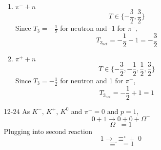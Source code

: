 \documentclass{2620hw}
\begin{document}
\begin{enumerate}
\begin{enumerate}
	\item $\pi^- +n$
	\[
		T \in \{-\frac{3}{2}, \frac{3}{2}\}
	\]
	Since $T_3 = -\frac{1}{2}$ for neutron and -1 for $\pi^-$,
	\[
		T_{3_{net}} = -\frac{1}{2}-1 = -\frac{3}{2}
	\]

	\item $\pi^+ +n$
	\[
		T \in \{-\frac{3}{2},-\frac{1}{2}, \frac{1}{2}, \frac{3}{2}\}
	\]
	Since $T_3 = -\frac{1}{2}$ for neutron and 1 for $\pi^-$,
	\[
		T_{3_{net}} = -\frac{1}{2}+1 = 1
	\]
\end{enumerate}

\item [12-24] As $K^-$, $K^+$, $K^0$ and $\pi^- = 0$ and $p = 1$,
\[
	0 + 1 \rightarrow 0 + 0 + \Omega^- 
\]
\[
	\Omega^- = 1
\]
Plugging into second reaction
\[
	1 \rightarrow \; \equiv^{\circ} + \; 0
\]
\[
	\equiv^{\circ} \; = 1
\]

\end{enumerate}
\end{document}
